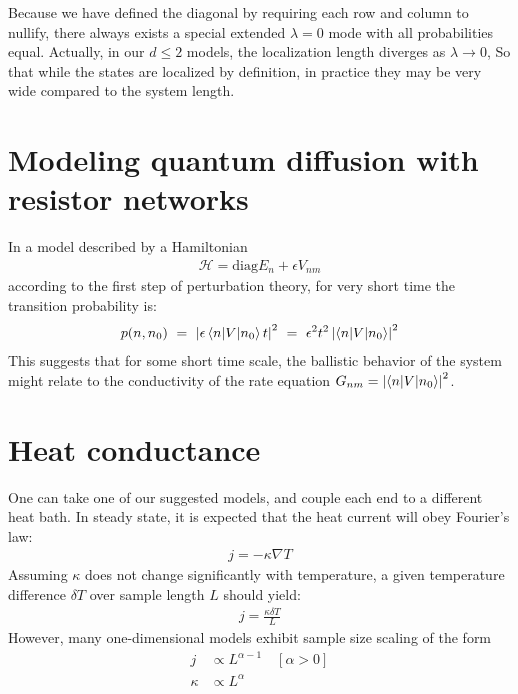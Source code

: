 Because we have defined the diagonal by requiring each row and column to nullify,
there always exists a special extended $\lambda=0$ mode with all probabilities equal. 
Actually, in our $d\le 2$ models, the localization length diverges as $\lambda\rightarrow 0$,
So that while the states are localized by definition, in practice they may be very wide
compared to the system length.



\section{Modeling quantum diffusion with resistor networks}


In a model described by a Hamiltonian 
%
\begin{align}
\mathcal{H} = \textrm{diag}{E_n} + \epsilon {V_{nm}}
\end{align}
%
according to the first step of perturbation theory,
for very short time the transition probability is:
%
\begin{align}
 p(n, n_0)\ =\ \left| \epsilon \bra n| V |n_0\ket t\right|^2 \ = \ \epsilon^2 t^2\left| \bra n| V |n_0\ket \right|^2
\end{align}
%
This suggests that for some short time scale, the ballistic behavior
of the system might relate to the conductivity of the rate equation $G_{nm} = \left| \left\langle n| V |n_0\right\rangle \right|^2$.




\section{Heat conductance}

One can take one of our suggested models, and couple each end to a different heat bath.
In steady state, it is expected that the heat current will obey Fourier's law:
%
\begin{align}
j = -\kappa\nabla T
\end{align}
%
Assuming $\kappa$ does not change significantly with temperature, a given 
temperature difference $\delta T$ over sample length $L$ should yield:
%
\begin{align}
j = \frac{\kappa \delta T}{L}
\end{align}
%
However, many one-dimensional models 
\cite{narayan_anomalous_2002,dhar_heat_2001,lepri_anomalous_1998,savin_heat_2002} 
exhibit sample size scaling of the form
%
\begin{align}
j         &\propto L^{\alpha-1}\quad [\alpha>0] \\
\kappa    &\propto L^\alpha
\end{align}

